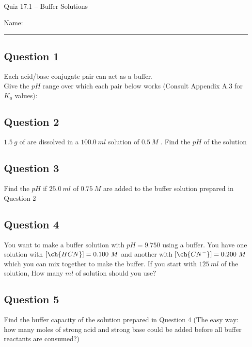 \documentclass[11pt, letterpaper]{memoir}
\begin{document}
	\begin{center}
		{\large	Quiz 17.1 -- Buffer Solutions}
	\end{center}
	{\large Name: \rule[-1mm]{4in}{.1pt} 
	
	\subsection*{Question 1}
	Each acid/base conjugate pair can act as a buffer. \\Give the $pH$ range over which each pair below works (Consult Appendix A.3 for $K_a$ values):
	
	{\large {} \hspace{6em} \hspace{6em} \hspace{6em} }
	
	\vspace{2em}
	\subsection*{Question 2}
	$1.5~g$ of  are dissolved in a $100.0~ml$ solution of $0.5~M$ . Find the $pH$ of the solution
	
	\vspace{6em}
	\subsection*{Question 3}
	Find the $pH$ if $25.0~ml$ of $0.75~M$  are added to the buffer solution prepared in Question 2
	
	\vspace{6em}
	\subsection*{Question 4}
	You want to make a buffer solution with $pH=9.750$ using a  buffer. You have one solution with $\left[\ch{HCN}\right]=0.100~M$ and another with $\left[\ch{CN^-}\right]=0.200~M$ which you can mix together to make the buffer. If you start with $125~ml$ of the  solution, How many $ml$ of  solution should you use?
	
	\vspace{6em}
	\subsection*{Question 5}
	Find the buffer capacity of the solution prepared in Question 4 (The easy way: how many moles of strong acid and strong base could be added before all buffer reactants are consumed?)
	\newpage
	\pagestyle{empty}
	\addtocounter{page}{-1}
}
\end{document}
